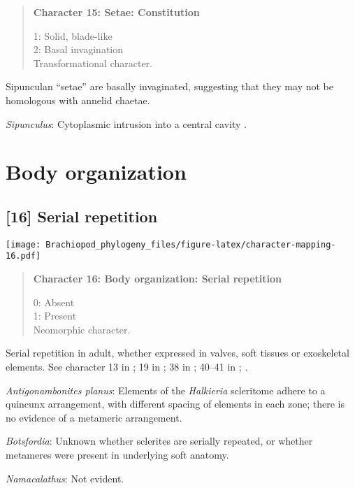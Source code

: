 \documentclass[openany]{book}
\theoremstyle{definition}
\theoremstyle{definition}
\theoremstyle{definition}
\theoremstyle{remark}
\begin{document}
\begin{quote}
\textbf{Character 15: Setae: Constitution}

1: Solid, blade-like\\
2: Basal invagination\\
Transformational character.
\end{quote}

Sipunculan ``setae'' are basally invaginated, suggesting that they may
not be homologous with annelid chaetae.

\hypertarget{Sipunculus-coding-15}{}
\emph{Sipunculus}: Cytoplasmic intrusion into a central cavity
\citep{Gordon1975}.

\section{Body organization}\label{body-organization}

\subsection*{{[}16{]} Serial repetition}\label{serial-repetition}

\texttt{[image: Brachiopod\_phylogeny\_files/figure-latex/character-mapping-16.pdf]}

\begin{quote}
\textbf{Character 16: Body organization: Serial repetition}

0: Absent\\
1: Present\\
Neomorphic character.
\end{quote}

Serial repetition in adult, whether expressed in valves, soft tissues or
exoskeletal elements. See character 13 in \citet{Rouse1999}; 19 in
\citet{Vinther2008}; 38 in \citet{Haszprunar1996}; 40--41 in
\citet{Sutton2012}; \citet{Wanninger2009}.

\hypertarget{Antigonambonites_planus-coding-16}{}
\emph{Antigonambonites planus}: Elements of the \emph{Halkieria}
scleritome adhere to a quincunx arrangement, with different spacing of
elements in each zone; there is no evidence of a metameric arrangement.

\hypertarget{Botsfordia-coding-16}{}
\emph{Botsfordia}: Unknown whether sclerites are serially repeated, or
whether metameres were present in underlying soft anatomy.

\hypertarget{Namacalathus-coding-16}{}
\emph{Namacalathus}: Not evident.
\end{document}
